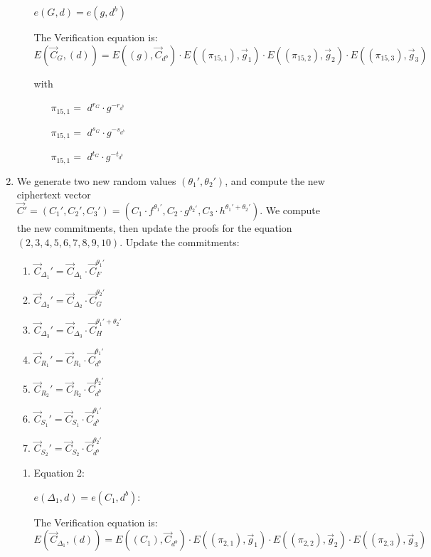 \begin{description}
\begin{enumerate}
\begin{enumerate}
      $e(\boxed{G},d) = e(g, \boxed{d^b})$

      The Verification equation is: $E(\vec{C}_G, (d)) = E((g), \vec{C}_{d^b}) \cdot E((\pi_{15,1}), \vec{g}_1)\cdot E((\pi_{15,2}), \vec{g}_2)\cdot E((\pi_{15,3}), \vec{g}_3)$

      with

      \begin{itemize}
      \item[$\pi_{15,1} = $] $d^{r_G} \cdot g^{-r_{d^b}}$    
      \item[$\pi_{15,1} = $] $d^{s_G} \cdot g^{-s_{d^b}}$    
      \item[$\pi_{15,1} = $] $d^{t_G} \cdot g^{-t_{d^b}}$
      \end{itemize}

    \end{enumerate}

  \item We generate two new random values $(\theta_1', \theta_2')$, and compute the new ciphertext vector $\vec{C}' = (C_1', C_2', C_3') = (C_1 \cdot f^{\theta_1'}, C_2 \cdot g^{\theta_2'}, C_3 \cdot h^{\theta_1'+\theta_2'})$. We compute the new commitments, then update the proofs for the equation $(2, 3, 4, 5, 6, 7, 8, 9, 10)$. Update the commitments:
    \begin{enumerate}
    \item $\vec{C}_{\Delta_1}' = \vec{C}_{\Delta_1} \cdot \vec{C}_{F}^{\theta_1'}$
    \item $\vec{C}_{\Delta_2}' = \vec{C}_{\Delta_2} \cdot \vec{C}_{G}^{\theta_2'}$
    \item $\vec{C}_{\Delta_3}' = \vec{C}_{\Delta_3} \cdot \vec{C}_{H}^{\theta_1' + \theta_2'}$
    \item $\vec{C}_{R_1}' = \vec{C}_{R_1} \cdot \vec{C}_{d^b}^{\theta_1'}$
    \item $\vec{C}_{R_2}' = \vec{C}_{R_2} \cdot \vec{C}_{d^b}^{\theta_2'}$
    \item $\vec{C}_{S_1}' = \vec{C}_{S_1} \cdot \vec{C}_{d^b}^{\theta_1'}$
    \item $\vec{C}_{S_2}' = \vec{C}_{S_2} \cdot \vec{C}_{d^b}^{\theta_2'}$
    \end{enumerate}
    \begin{enumerate}
    \item Equation 2:

      $e(\boxed{\Delta_1},d) = e(C_1, \boxed{d^b})$:
      
      The Verification equation is:  $E(\vec{C}_{\Delta_1}, (d)) = E((C_1), \vec{C}_{d^b}) \cdot E((\pi_{2,1}), \vec{g}_1)\cdot E((\pi_{2,2}), \vec{g}_2)\cdot E((\pi_{2,3}), \vec{g}_3)$
      

\end{enumerate}
\end{enumerate}
\end{description}
